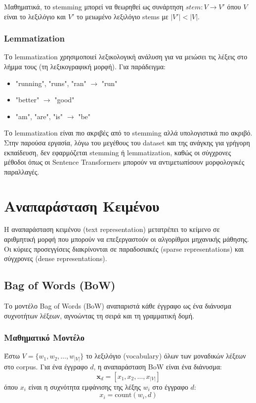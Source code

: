 \documentclass[12pt,a4paper,twoside]{book}
\begin{document}
Μαθηματικά, το stemming μπορεί να θεωρηθεί ως συνάρτηση \(stem: V \rightarrow V'\) όπου \(V\) είναι το λεξιλόγιο και \(V'\) το μειωμένο λεξιλόγιο stems με \(|V'| < |V|\).

\subsubsection{Lemmatization}

Το lemmatization χρησιμοποιεί λεξικολογική ανάλυση για να μειώσει τις λέξεις στο λήμμα τους (τη λεξικογραφική μορφή). Για παράδειγμα:
\begin{itemize}
    \item "running", "runs", "ran" \(\rightarrow\) "run"
    \item "better" \(\rightarrow\) "good"
    \item "am", "are", "is" \(\rightarrow\) "be"
\end{itemize}

Το lemmatization είναι πιο ακριβές από το stemming αλλά υπολογιστικά πιο ακριβό. Στην παρούσα εργασία, λόγω του μεγέθους του dataset και της ανάγκης για γρήγορη εκπαίδευση, δεν εφαρμόζεται stemming ή lemmatization, καθώς οι σύγχρονες μέθοδοι όπως οι Sentence Transformers μπορούν να αντιμετωπίσουν μορφολογικές παραλλαγές.

\section{Αναπαράσταση Κειμένου}

Η αναπαράσταση κειμένου (text representation) μετατρέπει το κείμενο σε αριθμητική μορφή που μπορούν να επεξεργαστούν οι αλγορίθμοι μηχανικής μάθησης. Οι κύριες προσεγγίσεις διακρίνονται σε παραδοσιακές (sparse representations) και σύγχρονες (dense representations).

\subsection{Bag of Words (BoW)}

Το μοντέλο Bag of Words (BoW) αναπαριστά κάθε έγγραφο ως ένα διάνυσμα συχνοτήτων λέξεων, αγνοώντας τη σειρά και τη γραμματική δομή.

\subsubsection{Μαθηματικό Μοντέλο}

Έστω \(V = \{w_1, w_2, \ldots, w_{|V|}\}\) το λεξιλόγιο (vocabulary) όλων των μοναδικών λέξεων στο corpus. Για ένα έγγραφο \(d\), η αναπαράσταση BoW είναι ένα διάνυσμα:
\begin{equation}
    \mathbf{x}_d = [x_1, x_2, \ldots, x_{|V|}]
\end{equation}
όπου \(x_i\) είναι η συχνότητα εμφάνισης της λέξης \(w_i\) στο έγγραφο \(d\):
\begin{equation}
    x_i = \text{count}(w_i, d)
\end{equation}
\end{document}
